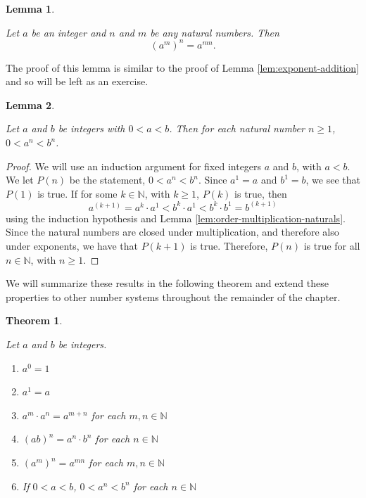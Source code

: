 \documentclass[
]{book}
\newtheorem{theorem}{Theorem}[chapter]
\newtheorem{lemma}{Lemma}[chapter]
\theoremstyle{definition}
\theoremstyle{definition}
\theoremstyle{definition}
\theoremstyle{definition}
\theoremstyle{remark}
\begin{document}
\begin{lemma}
\protect\hypertarget{lem:exponent-product}{}\label{lem:exponent-product}

Let \(a\) be an integer and \(n\) and \(m\) be any natural numbers. Then \[(a^m)^n = a^{mn}.\]

\end{lemma}

The proof of this lemma is similar to the proof of Lemma \ref{lem:exponent-addition} and so will be left as an exercise.

\begin{lemma}
\protect\hypertarget{lem:unlabeled-div-36}{}\label{lem:unlabeled-div-36}

Let \(a\) and \(b\) be integers with \(0<a<b\). Then for each natural number \(n\geq 1\), \(0<a^n<b^n\).

\end{lemma}

\begin{proof}

We will use an induction argument for fixed integers \(a\) and \(b\), with \(a<b\). We let \(P(n)\) be the statement, \(0<a^n<b^n\). Since \(a^1=a\) and \(b^1=b\), we see that \(P(1)\) is true. If for some \(k\in \mathbb{N}\), with \(k\geq 1\), \(P(k)\) is true, then
\[a^{(k+1)}=a^k\cdot a^1 < b^k \cdot a^1 < b^k \cdot b^1 = b^{(k+1)}\] using the induction hypothesis and Lemma \ref{lem:order-multiplication-naturals}. Since the natural numbers are closed under multiplication, and therefore also under exponents, we have that \(P(k+1)\) is true. Therefore, \(P(n)\) is true for all \(n\in \mathbb{N}\), with \(n\geq 1\).

\end{proof}

We will summarize these results in the following theorem and extend these properties to other number systems throughout the remainder of the chapter.

\begin{theorem}
\protect\hypertarget{thm:exponents-integers}{}\label{thm:exponents-integers}

Let \(a\) and \(b\) be integers.

\begin{enumerate}
\def\labelenumi{\alph{enumi}.}
\item
  \(a^0=1\)
\item
  \(a^1=a\)
\item
  \(a^m\cdot a^n = a^{m+n}\) for each \(m,n\in \mathbb{N}\)
\item
  \((ab)^n=a^n\cdot b^n\) for each \(n\in \mathbb{N}\)
\item
  \((a^m)^n = a^{mn}\) for each \(m,n\in \mathbb{N}\)
\item
  If \(0<a<b\), \(0<a^n<b^n\) for each \(n\in \mathbb{N}\)
\end{enumerate}

\end{theorem}
\end{document}
